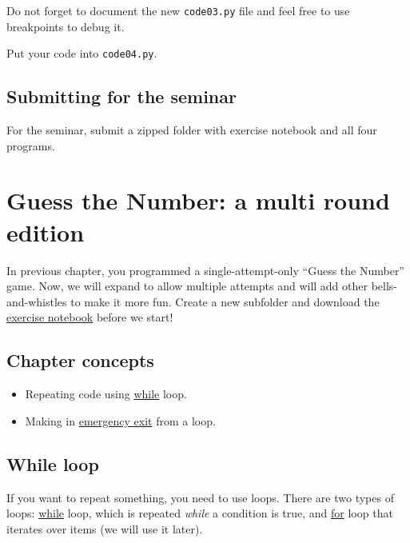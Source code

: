 \documentclass[
]{book}
\providecommand{\tightlist}{%
  \setlength{\itemsep}{0pt}\setlength{\parskip}{0pt}}
\begin{document}
Do not forget to document the new \texttt{code03.py} file and feel free to use breakpoints to debug it.

Put your code into \texttt{code04.py}.

\hypertarget{submitting-for-the-seminar}{%
\section{Submitting for the seminar}\label{submitting-for-the-seminar}}

For the seminar, submit a zipped folder with exercise notebook and all four programs.

\hypertarget{guess-the-number-multi-round}{%
\chapter{Guess the Number: a multi round edition}\label{guess-the-number-multi-round}}

In previous chapter, you programmed a single-attempt-only ``Guess the Number'' game. Now, we will expand to allow multiple attempts and will add other bells-and-whistles to make it more fun. Create a new subfolder and download the \href{notebooks/Guess\%20the\%20number\%20-\%20multi\%20round.ipynb}{exercise notebook} before we start!

\hypertarget{chapter-concepts-2}{%
\section{Chapter concepts}\label{chapter-concepts-2}}

\begin{itemize}
\tightlist
\item
  Repeating code using \protect\hyperlink{while-loop}{while} loop.
\item
  Making in \protect\hyperlink{break}{emergency exit} from a loop.
\end{itemize}

\hypertarget{while-loop}{%
\section{While loop}\label{while-loop}}

If you want to repeat something, you need to use loops. There are two types of loops: \href{https://docs.python.org/3/reference/compound_stmts.html\#the-while-statement}{while} loop, which is repeated \emph{while} a condition is true, and \href{https://docs.python.org/3/reference/compound_stmts.html\#the-for-statement}{for} loop that iterates over items (we will use it later).
\end{document}
